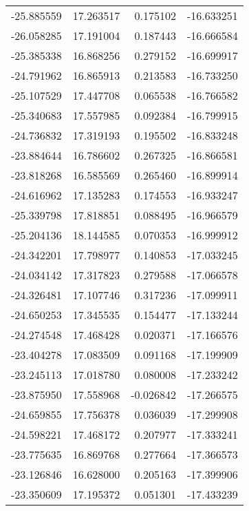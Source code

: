 \begin{tabular}{rrrr}
      -25.885559 &        17.263517 &    0.175102 & -16.633251 \\
      -26.058285 &        17.191004 &    0.187443 & -16.666584 \\
      -25.385338 &        16.868256 &    0.279152 & -16.699917 \\
      -24.791962 &        16.865913 &    0.213583 & -16.733250 \\
      -25.107529 &        17.447708 &    0.065538 & -16.766582 \\
      -25.340683 &        17.557985 &    0.092384 & -16.799915 \\
      -24.736832 &        17.319193 &    0.195502 & -16.833248 \\
      -23.884644 &        16.786602 &    0.267325 & -16.866581 \\
      -23.818268 &        16.585569 &    0.265460 & -16.899914 \\
      -24.616962 &        17.135283 &    0.174553 & -16.933247 \\
      -25.339798 &        17.818851 &    0.088495 & -16.966579 \\
      -25.204136 &        18.144585 &    0.070353 & -16.999912 \\
      -24.342201 &        17.798977 &    0.140853 & -17.033245 \\
      -24.034142 &        17.317823 &    0.279588 & -17.066578 \\
      -24.326481 &        17.107746 &    0.317236 & -17.099911 \\
      -24.650253 &        17.345535 &    0.154477 & -17.133244 \\
      -24.274548 &        17.468428 &    0.020371 & -17.166576 \\
      -23.404278 &        17.083509 &    0.091168 & -17.199909 \\
      -23.245113 &        17.018780 &    0.080008 & -17.233242 \\
      -23.875950 &        17.558968 &   -0.026842 & -17.266575 \\
      -24.659855 &        17.756378 &    0.036039 & -17.299908 \\
      -24.598221 &        17.468172 &    0.207977 & -17.333241 \\
      -23.775635 &        16.869768 &    0.277664 & -17.366573 \\
      -23.126846 &        16.628000 &    0.205163 & -17.399906 \\
      -23.350609 &        17.195372 &    0.051301 & -17.433239 \\

\end{tabular}
